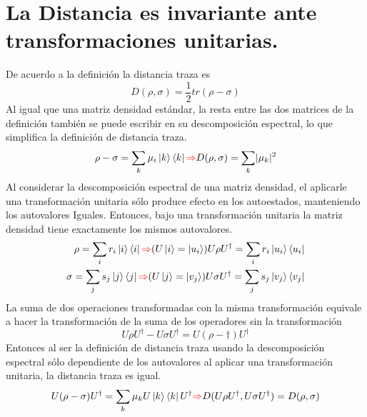 \documentclass{book}
\begin{document}
\section{{La Distancia es invariante ante transformaciones unitarias.}}
 De acuerdo a la definición la distancia traza es
\begin{equation}{D(\rho, \sigma) =\frac{1}{2}tr(\rho-\sigma)} \end{equation}
Al igual que una matriz densidad estándar, la resta entre las dos matrices de la definición también se puede escribir en su descomposición espectral, lo que simplifica la definición de distancia traza. 
\begin{equation} {\rho-\sigma=\sum_k \mu_i \ket{k} \bra{k}  \textcolor{red}{\Rightarrow} D(\rho, \sigma) = \sum_k \lvert \mu_k \rvert^2} \end{equation}
Al considerar la descomposición espectral de una matriz densidad, el aplicarle una transformación unitaria sólo produce efecto en los autoestados, manteniendo los autovalores Iguales.  Entonces, bajo una transformación unitaria la matriz densidad tiene exactamente los mismos autovalores. 
\begin{equation}\begin{aligned} {\rho=\sum_i r_i \ket{i}\bra{i} \textcolor{red}{\Rightarrow} (U\ket{i} = \ket{u_i} ) U\rho U^\dag =\sum_i r_i \ket{u_i} \bra{u_i} } \\ {\sigma=\sum_j s_j \ket{j} \bra{j} \textcolor{red}{\Rightarrow}  (U\ket{j} =\ket{v_j} ) U \sigma U^\dag = \sum_j s_j \ket{v_j}\bra{v_j}} \end{aligned} \end{equation}
La suma de dos operaciones transformadas con la misma transformación equivale a hacer la transformación de la suma de los operadores sin la transformación
\begin{equation} {U\rho U^\dag - U\sigma U^\dag= U(\rho-\dag) U^\dag } \end{equation}
Entonces al ser la definición de distancia traza usando la descomposición espectral sólo dependiente de los  autovalores al aplicar una transformación unitaria, la distancia traza es igual. 
\begin{equation} {U(\rho-\sigma) U^\dag= \sum_k \mu_k U\ket{k} \bra{k}U^\dag \textcolor{red}{\Rightarrow} D(U\rho U^\dag, U\sigma U^\dag) =D(\rho, \sigma)} \end{equation}
\end{document}
